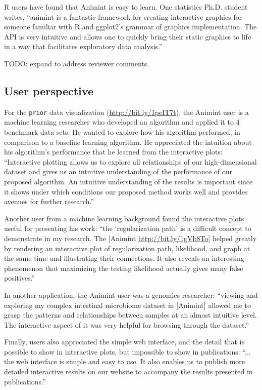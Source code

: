 \documentclass[10pt,journal,compsoc]{IEEEtran}\usepackage[]{graphicx}\usepackage[]{color}
\begin{document}
R users have found that Animint is easy to learn. One statistics
Ph.D. student writes, ``animint is a fantastic framework for creating
interactive graphics for someone familiar with R and ggplot2's grammar
of graphics implementation. The API is very intuitive and allows one
to quickly bring their static graphics to life in a way that
facilitates exploratory data analysis.''

TODO: expand to address reviewer comments.

\subsection{User perspective}

For the \texttt{prior} data visualization
(\url{http://bit.ly/1peIT7t}), the Animint user is a machine learning
researcher who developed an algorithm and applied it to 4 benchmark
data sets. He wanted to explore how his algorithm performed, in
comparison to a baseline learning algorithm. He appreciated the
intuition about his algorithm's performance that he learned from the
interactive plots: ``Interactive plotting allows us to explore all
relationships of our high-dimensional dataset and gives us an
intuitive understanding of the performance of our proposed
algorithm. An intuitive understanding of the results is important
since it shows under which conditions our proposed method works well
and provides avenues for further research.''

Another user from a machine learning background found the interactive
plots useful for presenting his work: ``the `regularization path' is a
difficult concept to demonstrate in my research. The [Animint
\url{http://bit.ly/1gVb8To}] helped greatly by rendering an
interactive plot of regularization path, likelihood, and graph at the
same time and illustrating their connections. It also reveals an
interesting phenomenon that maximizing the testing likelihood actually
gives many false positives.''

In another application, the Animint user was a genomics researcher:
``viewing and exploring my complex intestinal microbiome dataset in
[Animint] allowed me to grasp the patterns and relationships between
samples at an almost intuitive level. The interactive aspect of it was
very helpful for browsing through the dataset.''

Finally, users also appreciated the simple web interface, and the
detail that is possible to show in interactive plots, but impossible
to show in publications: ``...  the web interface is simple and easy
to use.  It also enables us to publish more detailed interactive
results on our website to accompany the results presented in
publications.''
\end{document}
